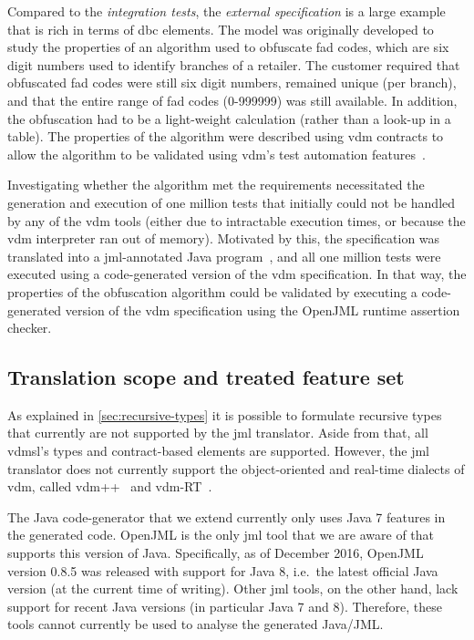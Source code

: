 Compared to the \emph{integration tests}, the \emph{external
  specification} is a large example that is rich in terms of \ac{dbc}
elements. The model was originally developed to study the properties
of an algorithm used to obfuscate \ac{fad} codes, which are six digit
numbers used to identify branches of a retailer. The customer required
that obfuscated \ac{fad} codes were still six digit numbers, remained
unique (per branch), and that the entire range of \ac{fad} codes
(0-999999) was still available. In addition, the obfuscation had to be
a light-weight calculation (rather than a look-up in a table). The
properties of the algorithm were described using \ac{vdm} contracts to
allow the algorithm to be validated using \ac{vdm}'s test automation
features~\cite{Larsen&10c}.

Investigating whether the algorithm met the requirements necessitated
the generation and execution of one million tests that initially could
not be handled by any of the \ac{vdm} tools (either due to intractable execution
times, or because the \ac{vdm} interpreter ran out of
memory). Motivated by this, the specification was translated into a
\ac{jml}-annotated Java program~\cite{Jorgensen&16}, and all one
million tests were executed using a code-generated version of the
\ac{vdm} specification. In that way, the properties of the obfuscation
algorithm could be validated by executing a code-generated version of
the \ac{vdm} specification using the OpenJML runtime assertion
checker.

\subsection{Translation scope and treated feature set}

As explained in \autoref{sec:recursive-types} it is possible to
formulate recursive types that currently are not supported by the
\ac{jml} translator. Aside from that, all \ac{vdmsl}'s types and
contract-based elements are supported. However, the \ac{jml}
translator does not currently support the object-oriented and
real-time dialects of \ac{vdm}, called \ac{vdm}++~\cite{Fitzgerald&05}
and \ac{vdm}-RT~\cite{Lausdahl&11}.

The Java code-generator that we extend currently only uses Java 7
features in the generated code. OpenJML is the only \ac{jml} tool that
we are aware of that supports this version of Java. Specifically, as
of December 2016, OpenJML version 0.8.5 was released with support for
Java 8, i.e.\ the latest official Java version (at the current time of
writing). Other \ac{jml} tools, on the other hand, lack support for
recent Java versions (in particular Java 7 and 8). Therefore, these
tools cannot currently be used to analyse the generated Java/JML.

